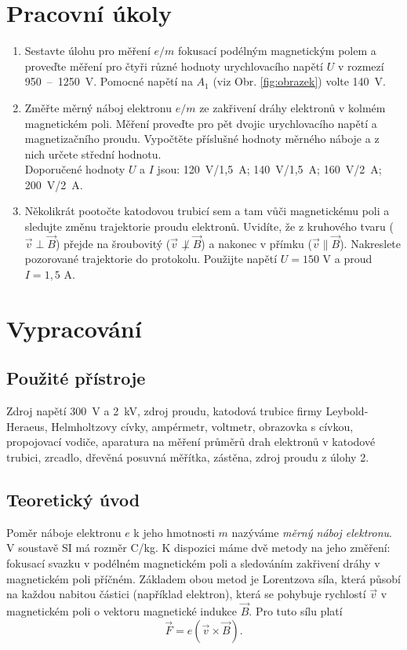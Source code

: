 \documentclass[english]{article}
\begin{document}


\setlength{\parindent}{0.5cm}
\section{Pracovní úkoly}
\begin{enumerate}
	\item Sestavte úlohu pro měření $e/m$ fokusací podélným magnetickým polem a proveďte měření pro čtyři různé hodnoty urychlovacího napětí $U$ v rozmezí 950~--~1250~V. Pomocné napětí na $A_1$ (viz Obr. \ref{fig:obrazek}) volte 140~V.
	\item Změřte měrný náboj elektronu $e/m$ ze zakřivení dráhy elektronů v kolmém magnetickém poli. Měření proveďte pro pět dvojic urychlovacího napětí a magnetizačního proudu. Vypočtěte příslušné hodnoty měrného náboje a z nich určete střední hodnotu.\\
	Doporučené hodnoty $U$ a $I$ jsou: 120~V/1,5~A; 140~V/1,5~A; 160~V/2~A; 200~V/2~A.
	\item Několikrát pootočte katodovou trubicí sem a tam vůči magnetickému poli a sledujte změnu trajektorie proudu elektronů. Uvidíte, že z kruhového tvaru ($\vec{v}\perp\vec{B}$) přejde na šroubovitý ($\vec{v}\not\perp\vec{B}$) a nakonec v přímku ($\vec{v}\parallel\vec{B}$). Nakreslete pozorované trajektorie do protokolu. Použijte napětí $U = 150$ V a proud $I = 1,5$ A.
\end{enumerate}

\section{Vypracování}

	\subsection{Použité přístroje}
		Zdroj napětí 300~V a 2~kV, zdroj proudu, katodová trubice firmy Leybold-Heraeus, Helmholtzovy cívky, ampérmetr, voltmetr, obrazovka s cívkou, propojovací vodiče, aparatura na měření průměrů drah elektronů v katodové trubici, zrcadlo, dřevěná posuvná měřítka, zástěna, zdroj proudu z úlohy 2.
		
	\subsection{Teoretický úvod}
		Poměr náboje elektronu $e$ k jeho hmotnosti $m$ nazýváme \emph{měrný náboj elektronu}. V soustavě SI má rozměr C/kg. K dispozici máme dvě metody na jeho změření: fokusací svazku v podélném magnetickém poli a sledováním zakřivení dráhy v magnetickém poli příčném. Základem obou metod je Lorentzova síla, která působí na každou nabitou částici (například elektron), která se pohybuje rychlostí $\vec{v}$ v magnetickém poli o vektoru magnetické indukce $\vec{B}$. Pro tuto sílu platí
		\begin{equation} \label{eq:lorentzova_sila}
		\vec{F} = e \left( \vec{v} \times \vec{B} \right).
		\end{equation}
		
\end{document}
